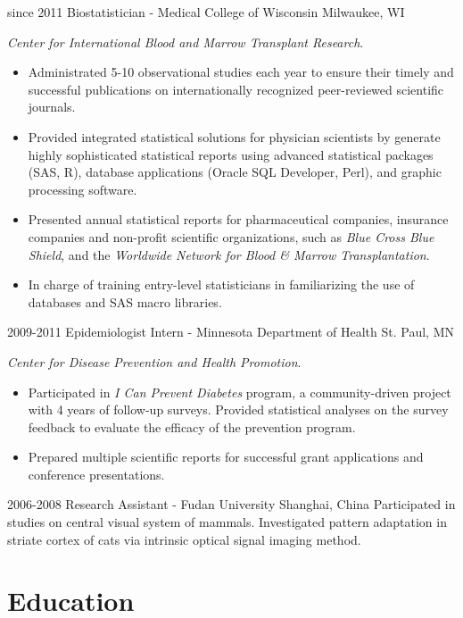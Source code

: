 \documentclass[11pt, print]{friggeri-cv}
\begin{document}
\begin{entrylist}
  \entry
    {since 2011}
    {Biostatistician - Medical College of Wisconsin}
    {Milwaukee, WI}
    {
    \textit{Center for International Blood and Marrow Transplant Research}.
    \begin{itemize}
      \item Administrated 5-10 observational studies each year to ensure their timely and successful publications on internationally recognized peer-reviewed scientific journals.
      \item Provided integrated statistical solutions for physician scientists by generate highly sophisticated statistical reports using advanced statistical packages (SAS, R), database applications (Oracle SQL Developer, Perl), and graphic processing software.
      \item Presented annual statistical reports for pharmaceutical companies, insurance companies and non-profit scientific organizations, such as \textit{Blue Cross Blue Shield}, and the \textit{Worldwide Network for Blood \& Marrow Transplantation}.
      \item In charge of training entry-level statisticians in familiarizing the use of databases and SAS macro libraries.
    \end{itemize}
    }
  \entry
    {2009-2011}
    {Epidemiologist Intern - Minnesota Department of Health}
    {St. Paul, MN}
    {
    \textit{Center for Disease Prevention and Health Promotion}.
    \begin{itemize}
      \item Participated in \textit{I Can Prevent Diabetes} program, a community-driven project with 4 years of follow-up surveys. Provided statistical analyses on the survey feedback to evaluate the efficacy of the prevention program.
      \item Prepared multiple scientific reports for successful grant applications and conference presentations.
    \end{itemize}
    }
  \entry
    {2006-2008}
    {Research Assistant - Fudan University}
    {Shanghai, China}
    {Participated in studies on central visual system of mammals. Investigated pattern adaptation in striate cortex of cats via intrinsic optical signal imaging method.}
\end{entrylist}

\section{Education}
\end{document}
